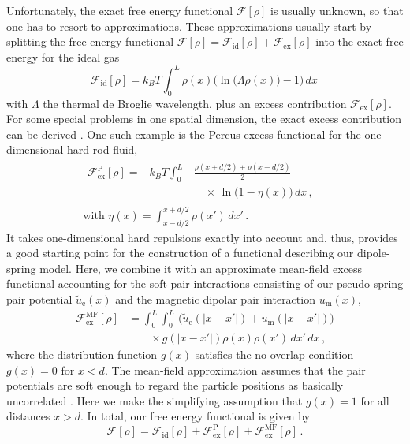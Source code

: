 \documentclass[aps,pre,twocolumn,superscriptaddress,nofootinbib]{revtex4}
\begin{document}
Unfortunately, the exact free energy functional $\mathcal{F}[\rho]$ is usually unknown, so that one has to resort to approximations. 
These approximations usually start by splitting the free energy functional $\mathcal{F}[\rho] = \mathcal{F}_\textrm{id}[\rho] + \mathcal{F}_\textrm{ex}[\rho]$ into the exact free energy for the ideal gas
%
\begin{equation}
	\mathcal{F}_\textrm{id}[\rho] = k_BT \int_0^L \rho(x) \bigg( \ln\big( \Lambda \rho(x) \big) - 1 \bigg) \, dx \,
	\label{Eq.DFT_ideal_functional}
\end{equation}
%
with $\Lambda$ the thermal de Broglie wavelength, plus an excess contribution $\mathcal{F}_\textrm{ex}[\rho]$. 
For some special problems in one spatial dimension, the exact excess contribution can be derived \cite{Tutschka2000_PhysRevE}.
One such example is the Percus excess functional \cite{Percus1976_JStatPhys} for the one-dimensional hard-rod fluid,
%
\begin{equation}
	\begin{gathered}
		\begin{aligned}
			\mathcal{F}_\textrm{ex}^\textrm{P}[\rho] = -k_BT \int_{0}^L & \frac{\rho(x + d/2) + \rho(x - d/2)}{2} \\
			&\quad\times\, \ln\big( 1 - \eta(x) \big) \, dx \, , &
		\end{aligned} \\
		\textrm{with } \eta(x) = \int_{x-d/2}^{x+d/2} \rho(x') \, dx' \, .
	\end{gathered}
	\label{Eq.DFT_Percus_functional}
\end{equation} 
%
It takes one-dimensional hard repulsions exactly into account and, thus, provides a good starting point for the construction of a functional describing our dipole-spring model.
Here, we combine it with an approximate mean-field excess functional accounting for the soft pair interactions consisting of our pseudo-spring pair potential $\tilde{u}_\textrm{e}(x)$ and the magnetic dipolar pair interaction $u_\textrm{m}(x)$,
%
\begin{equation}
		\begin{aligned}
			\mathcal{F}_\textrm{ex}^\textrm{MF}[\rho] &= \int_0^L  \int_0^L \, \big( \tilde{u}_\textrm{e}(|x - x'|) + u_\textrm{m}(|x - x'|) \big) \\
			&\qquad \times g(|x - x'|) \rho(x) \rho(x') \, dx' \, dx \, ,
		\end{aligned}
	\label{Eq.DFT_meanfield_functional}
\end{equation}
%
where the distribution function $g(x)$ satisfies the no-overlap condition $g(x) = 0$ for $x < d$. 
The mean-field approximation assumes that the pair potentials are soft enough to regard the particle positions as basically uncorrelated \cite{Tarazona2008_incollection}.
Here we make the simplifying assumption that $g(x) = 1$ for all distances $x > d$.
In total, our free energy functional is given by
%
\begin{equation}
	\mathcal{F}[\rho] = \mathcal{F}_\textrm{id}[\rho] + \mathcal{F}_\textrm{ex}^\textrm{P}[\rho] + \mathcal{F}_\textrm{ex}^\textrm{MF}[\rho] \, . 
	\label{Eq.DFT_dipole-spring_functional}
\end{equation}
%
\end{document}
